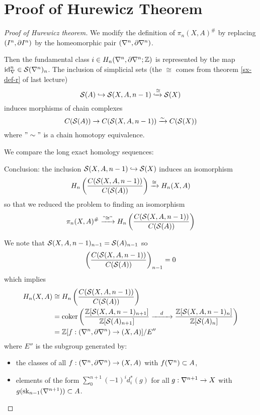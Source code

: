 
\section{Proof of Hurewicz Theorem}


\begin{proof}[Proof of Hurewicz theorem]
We modify the definition of $\pi_n(X,A)^\#$ by replacing $\pair$ by the homeomorphic pair $(\ns,\de\ns)$.

Then the fundamental class $i\in H_n(\ns,\de\ns;\Z)$ is represented by the map $\id_\ns\in\S(\ns)_n$. The inclusion of simplicial sets (the $\cong$ comes from theorem \ref{sx-def-r} of last lecture)
\[\S(A)\into\S(X,A,n-1)\xinto{\cong}\S(X)\]
induces morphisms of chain complexes
\[C(\S(A))\to C(\S(X,A,n-1))\xto{\sim}C(\S(X))\]
where $"\sim"$ is a chain homotopy equivalence.

We compare the long exact homology sequences:
\begin{center}
    \small
\end{center}

Conclusion: the inclusion $\S(X,A,n-1)\into\S(X)$ induces an isomorphism
\[H_n\left(\frac{C(\S(X,A,n-1))}{C(\S(A))}\right)\xto{\cong} H_n(X,A)\]
so that we reduced the problem to finding an isomorphism
\[\pi_n(X,A)^\#\xto{"\cong"} H_n\left(\frac{C(\S(X,A,n-1))}{C(\S(A))}\right)\]

We note that $\S(X,A,\ni)_\ni=\S(A)_\ni$ so
\[\left(\frac{C(\S(X,A,n-1))}{C(\S(A))}\right)_\ni=0\]
which implies
\begin{align*}
    H_n(X,A)&\cong H_n\left(\frac{C(\S(X,A,n-1))}{C(\S(A))}\right) \\
    &=\coker\left(\frac{\Z[\S(X,A,\ni)_{n+1}]}{\Z[\S(A)_{n+1}]}\xto{\quad d\quad} \frac{\Z[\S(X,A,\ni)_n]}{\Z[\S(A)_n]}\right) \\
    &=\Z[f:(\ns,\de\ns)\to (X,A)]/E''
\end{align*}
where $E''$ is the subgroup generated by:
\begin{itemize}[label={-}]
    \item the classes of all $f:(\ns,\de\ns)\to(X,A)$ with $f(\ns)\subset A$,
    \item elements of the form $\sum_0^{n+1}(-1)^id_i^*(g)$ for all $g:\sx{n+1}\to X$ with $g(\sk_\ni(\sx{n+1}))\subset A$.
\end{itemize}


\end{proof}
